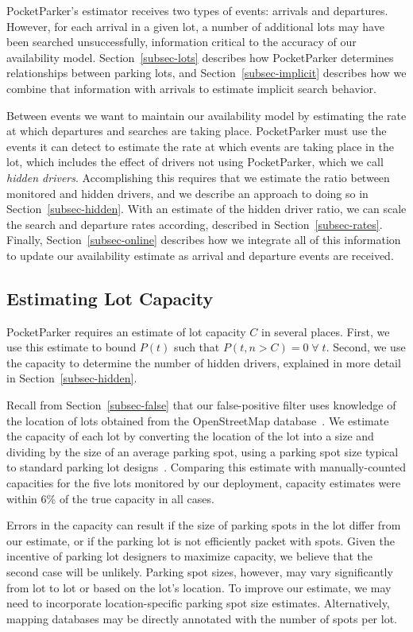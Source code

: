 PocketParker's estimator receives two types of events: arrivals and
departures. However, for each arrival in a given lot, a number of additional
lots may have been searched unsuccessfully, information critical to the
accuracy of our availability model. Section~\ref{subsec-lots} describes how
PocketParker determines relationships between parking lots, and
Section~\ref{subsec-implicit} describes how we combine that information with
arrivals to estimate implicit search behavior.

Between events we want to maintain our availability model by estimating the
rate at which departures and searches are taking place. PocketParker must use
the events it can detect to estimate the rate at which events are taking
place in the lot, which includes the effect of drivers not using
PocketParker, which we call \textit{hidden drivers}. Accomplishing this
requires that we estimate the ratio between monitored and hidden drivers, and
we describe an approach to doing so in Section~\ref{subsec-hidden}. With an
estimate of the hidden driver ratio, we can scale the search and departure
rates according, described in Section~\ref{subsec-rates}. Finally,
Section~\ref{subsec-online} describes how we integrate all of this
information to update our availability estimate as arrival and departure
events are received.

\subsection{Estimating Lot Capacity}
\label{subsec-capacity}

PocketParker requires an estimate of lot capacity $C$ in several places.
First, we use this estimate to bound $P(t)$ such that $P(t, n > C) =
0\;\forall\;t$. Second, we use the capacity to determine the number of hidden
drivers, explained in more detail in Section~\ref{subsec-hidden}.

Recall from Section~\ref{subsec-false} that our false-positive filter uses knowledge
of the location of lots obtained from the OpenStreetMap
database~\cite{FIXME}. We estimate the capacity of each lot by converting the
location of the lot into a size and dividing by the size of an average
parking spot, using a parking spot size typical to standard parking lot
designs~\cite{parkingdesign}. Comparing this estimate with manually-counted
capacities for the five lots monitored by our deployment, capacity estimates
were within 6\% of the true capacity in all cases.

Errors in the capacity can result if the size of parking spots in the lot
differ from our estimate, or if the parking lot is not efficiently packet
with spots. Given the incentive of parking lot designers to maximize
capacity, we believe that the second case will be unlikely. Parking spot
sizes, however, may vary significantly from lot to lot or based on the lot's
location. To improve our estimate, we may need to incorporate
location-specific parking spot size estimates. Alternatively, mapping
databases may be directly annotated with the number of spots per lot.

